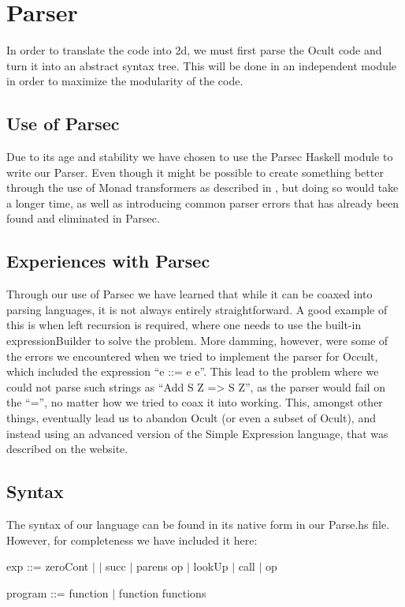 \section{Parser}
In order to translate the code into 2d, we must first parse the Ocult code and turn it into an abstract syntax tree. This will be done in an independent module in order to maximize the modularity of the code.

\subsection{Use of Parsec}
Due to its age and stability we have chosen to use the Parsec Haskell module to write our Parser. Even though it might be possible to create something better through the use of Monad transformers as described in \cite{partial+parsing}, but doing so would take a longer time, as well as introducing common parser errors that has already been found and eliminated in Parsec.

\subsection{Experiences with Parsec}
Through our use of Parsec we have learned that while it can be coaxed into parsing languages, it is not always entirely straightforward. A good example of this is when left recursion is required, where one needs to use the built-in expressionBuilder to solve the problem. More damming, however, were some of the errors we encountered when we tried to implement the parser for Occult, which included the expression ``e ::= e e''. This lead to the problem where we could not parse such strings as ``Add S Z => S Z'', as the parser would fail on the ``='', no matter how we tried to coax it into working. This, amongst other things, eventually lead us to abandon Ocult (or even a subset of Ocult), and instead using an advanced version of the Simple Expression language, that was described on the website.

\subsection{Syntax}
The syntax of our language can be found in its native form in our Parse.hs file. However, for completeness we have included it here:

exp ::= zeroCont $\mid$  $\mid$ succ $\mid$ parens op $\mid$ lookUp $\mid$ call $\mid$ op

program ::= function $\mid$ function functions

